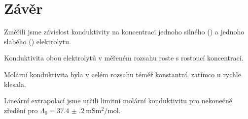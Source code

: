 \section*{Závěr}
Změřili jsme závislost konduktivity na koncentraci jednoho silného () a jednoho slabého () elektrolytu.

Konduktivita obou elektrolytů v měřeném rozsahu roste s rostoucí koncentrací.

Molární konduktivita  byla v celém rozsahu téměř konstantní, zatímco u  rychle klesala.

Lineární extrapolací jsme určili limitní molární konduktivitu pro nekonečné zředění pro  $\Lambda_{0}=\SI{37.4(2)}{\milli\siemens\metre\squared\per\mole}$.